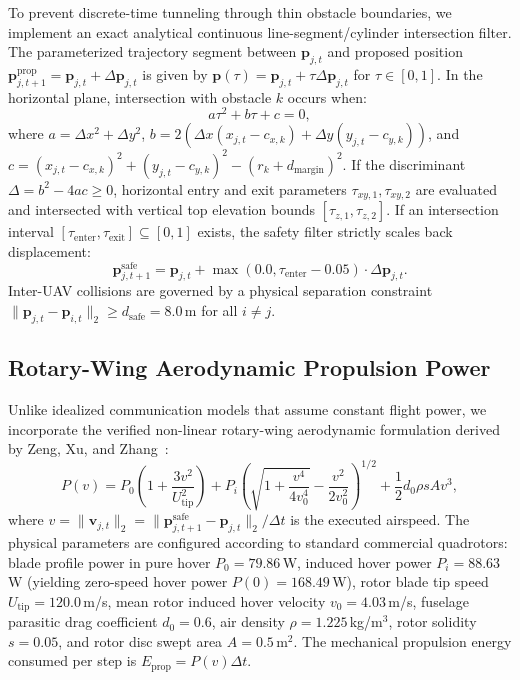 \documentclass[conference]{IEEEtran}
\begin{document}
To prevent discrete-time tunneling through thin obstacle boundaries, we implement an exact analytical continuous line-segment/cylinder intersection filter. The parameterized trajectory segment between $\mathbf{p}_{j, t}$ and proposed position $\mathbf{p}_{j, t+1}^{\text{prop}} = \mathbf{p}_{j, t} + \Delta \mathbf{p}_{j, t}$ is given by $\mathbf{p}(\tau) = \mathbf{p}_{j, t} + \tau \Delta \mathbf{p}_{j, t}$ for $\tau \in [0, 1]$. In the horizontal plane, intersection with obstacle $k$ occurs when:
\begin{equation}
a \tau^2 + b \tau + c = 0,
\end{equation}
where $a = \Delta x^2 + \Delta y^2$, $b = 2(\Delta x(x_{j,t} - c_{x,k}) + \Delta y(y_{j,t} - c_{y,k}))$, and $c = (x_{j,t} - c_{x,k})^2 + (y_{j,t} - c_{y,k})^2 - (r_k + d_{\text{margin}})^2$. If the discriminant $\Delta = b^2 - 4ac \ge 0$, horizontal entry and exit parameters $\tau_{xy, 1}, \tau_{xy, 2}$ are evaluated and intersected with vertical top elevation bounds $[\tau_{z, 1}, \tau_{z, 2}]$. If an intersection interval $[\tau_{\text{enter}}, \tau_{\text{exit}}] \subseteq [0, 1]$ exists, the safety filter strictly scales back displacement:
\begin{equation}
\mathbf{p}_{j, t+1}^{\text{safe}} = \mathbf{p}_{j, t} + \max(0.0, \tau_{\text{enter}} - 0.05) \cdot \Delta \mathbf{p}_{j, t}.
\end{equation}
Inter-UAV collisions are governed by a physical separation constraint $\|\mathbf{p}_{j, t} - \mathbf{p}_{i, t}\|_2 \ge d_{\text{safe}} = 8.0$\,m for all $i \neq j$.

\subsection{Rotary-Wing Aerodynamic Propulsion Power}
Unlike idealized communication models that assume constant flight power, we incorporate the verified non-linear rotary-wing aerodynamic formulation derived by Zeng, Xu, and Zhang~\cite{zeng2019energy}:
\begin{equation}
P(v) = P_0 \left(1 + \frac{3 v^2}{U_{\text{tip}}^2}\right) + P_i \left(\sqrt{1 + \frac{v^4}{4 v_0^4}} - \frac{v^2}{2 v_0^2}\right)^{1/2} + \frac{1}{2} d_0 \rho s A v^3,
\label{eq:aero_power}
\end{equation}
where $v = \|\mathbf{v}_{j, t}\|_2 = \|\mathbf{p}_{j, t+1}^{\text{safe}} - \mathbf{p}_{j, t}\|_2 / \Delta t$ is the executed airspeed. The physical parameters are configured according to standard commercial quadrotors: blade profile power in pure hover $P_0 = 79.86$\,W, induced hover power $P_i = 88.63$\,W (yielding zero-speed hover power $P(0) = 168.49$\,W), rotor blade tip speed $U_{\text{tip}} = 120.0$\,m/s, mean rotor induced hover velocity $v_0 = 4.03$\,m/s, fuselage parasitic drag coefficient $d_0 = 0.6$, air density $\rho = 1.225$\,kg/m$^3$, rotor solidity $s = 0.05$, and rotor disc swept area $A = 0.5$\,m$^2$. The mechanical propulsion energy consumed per step is $E_{\text{prop}} = P(v) \Delta t$.
\end{document}
